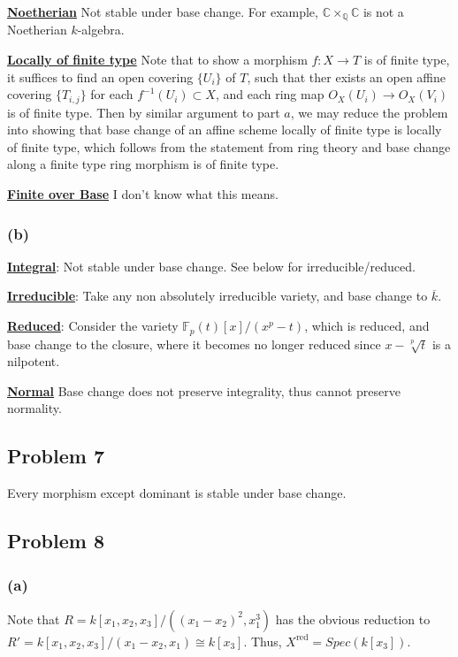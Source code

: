 \documentclass{article}
\theoremstyle{definition}
\theoremstyle{definition}
\theoremstyle{definition}
\theoremstyle{definition}
\theoremstyle{definition}
\theoremstyle{definition}
\theoremstyle{definition}
\begin{document}
\underline{\textbf{Noetherian}}
Not stable under base change. For example, $\mathbb{C}\times_{\mathbb{Q}} \mathbb{C}$ is not a Noetherian $k$-algebra.


\underline{\textbf{Locally of finite type}}
Note that to show a morphism $f: X\to T$ is of finite type, it suffices to find an open covering $\{U_i\}$ of $T$, such that ther exists an open affine covering $\{T_{i,j}\}$ for each $f^{-1}(U_i)\subset X$, and each ring map $O_X(U_i)\to O_X(V_i)$ is of finite type. Then by similar argument to part $a$, we may reduce the problem into showing that base change of an affine scheme locally of finite type is locally of finite type, which follows from the statement from ring theory and base change along a finite type ring morphism is of finite type.


\underline{\textbf{Finite over Base}}
I don't know what this means.

\subsubsection*{(b)}

\underline{\textbf{Integral}}: Not stable under base change. See below for irreducible/reduced.

\underline{\textbf{Irreducible}}: Take any non absolutely irreducible variety, and base change to $\overline{k}$.

\underline{\textbf{Reduced}}: Consider the variety $\mathbb{F}_p(t)[x]/(x^p-t)$, which is reduced, and base change to the closure, where it becomes no longer reduced since $x-\sqrt[p]{t}$ is a nilpotent. 

\underline{\textbf{Normal}}
Base change does not preserve integrality, thus cannot preserve normality. 





\subsection*{Problem 7}
Every morphism except dominant is stable under base change. 



\subsection*{Problem 8}
\subsubsection*{(a)}
Note that $R=k[x_1,x_2,x_3]/((x_1-x_2)^2,x_1^3)$ has the obvious reduction to $R'=k[x_1,x_2,x_3]/(x_1-x_2,x_1)\cong k[x_3]$. Thus, $X^{\textrm{red}}=Spec(k[x_3])$.
\end{document}
